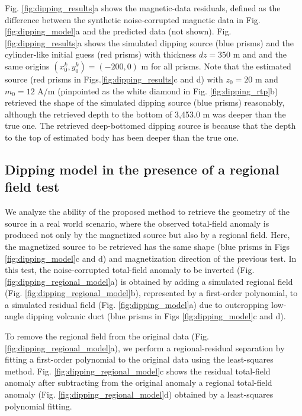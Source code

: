 Fig. \ref{fig:dipping_results}a shows the magnetic-data residuals, defined as the difference
between the synthetic noise-corrupted magnetic data in Fig. \ref{fig:dipping_model}a 
and the predicted data (not shown).
Fig. \ref{fig:dipping_results}a shows the simulated dipping source (blue prisms) and 
the cylinder-like initial guess (red prisms) with  thickness $ dz = 350 $ m and 
and the same origins $(x^k_0, y^k_0) = (-200, 0) $ m for all prisms.
Note that the estimated source (red prisms in Figs.\ref{fig:dipping_results}c and d)
with $z_0 = 20$ m and $m_0 = 12$ A/m 
(pinpointed as the white diamond in Fig. \ref{fig:dipping_rtp}b)
retrieved the shape of the  simulated dipping source (blue prisms) reasonably, although
the retrieved depth to the bottom of 3,453.0 m was deeper than the true one.
The retrieved deep-bottomed dipping source is because that the depth to the top 
of estimated body has been deeper than the true one.


\subsection{Dipping model in the presence of a regional field test}

We analyze the ability of the proposed method to retrieve the geometry of the source
in a real world scenario, where the observed total-field anomaly is produced not only by 
the magnetized source but also by  a regional field. 
Here, the magnetized source to be retrieved has the same shape (blue prisms in Figs \ref{fig:dipping_model}c and d) and magnetization direction of the previous test. 
In this test, the noise-corrupted total-field anomaly to be inverted 
(Fig. \ref{fig:dipping_regional_model}a) is obtained by adding 
a  simulated regional field (Fig. \ref{fig:dipping_regional_model}b), represented by a first-order polynomial, 
to  a simulated residual field (Fig. \ref{fig:dipping_model}a) due to outcropping low-angle dipping volcanic duct (blue prisms in Figs \ref{fig:dipping_model}c and d). 

To remove the regional field from the original data (Fig. \ref{fig:dipping_regional_model}a),
we perform a regional-residual separation by fitting a first-order polynomial to the original data using the least-squares method.
Fig. \ref{fig:dipping_regional_model}c shows the residual total-field anomaly after subtracting from the original anomaly a regional total-field anomaly 
(Fig. \ref{fig:dipping_regional_model}d) obtained by a least-squares polynomial fitting. 


